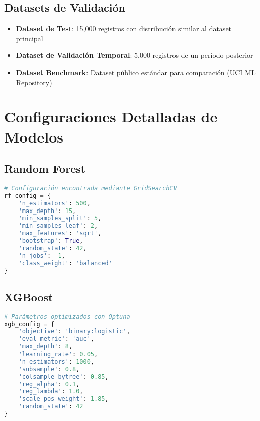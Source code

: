 \subsection{Datasets de Validación}
\label{subsec:datasets_validacion}

\begin{itemize}
    \item \textbf{Dataset de Test}: 15,000 registros con distribución similar al dataset principal
    \item \textbf{Dataset de Validación Temporal}: 5,000 registros de un período posterior
    \item \textbf{Dataset Benchmark}: Dataset público estándar para comparación (UCI ML Repository)
\end{itemize}


\section{Configuraciones Detalladas de Modelos}
\label{sec:configuraciones_modelos}

\subsection{Random Forest}
\label{subsec:config_rf}

\begin{lstlisting}[language=Python, caption=Configuración Random Forest Óptima]
# Configuración encontrada mediante GridSearchCV
rf_config = {
    'n_estimators': 500,
    'max_depth': 15,
    'min_samples_split': 5,
    'min_samples_leaf': 2,
    'max_features': 'sqrt',
    'bootstrap': True,
    'random_state': 42,
    'n_jobs': -1,
    'class_weight': 'balanced'
}
\end{lstlisting}

\subsection{XGBoost}
\label{subsec:config_xgb}

\begin{lstlisting}[language=Python, caption=Configuración XGBoost Óptima]
# Parámetros optimizados con Optuna
xgb_config = {
    'objective': 'binary:logistic',
    'eval_metric': 'auc',
    'max_depth': 8,
    'learning_rate': 0.05,
    'n_estimators': 1000,
    'subsample': 0.8,
    'colsample_bytree': 0.85,
    'reg_alpha': 0.1,
    'reg_lambda': 1.0,
    'scale_pos_weight': 1.85,
    'random_state': 42
}
\end{lstlisting}

